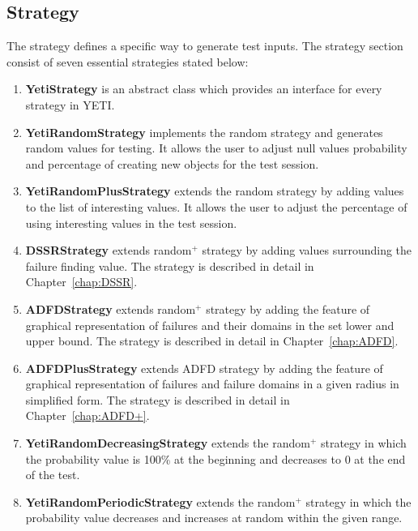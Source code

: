 \subsection{Strategy}
The strategy defines a specific way to generate test inputs. The strategy section consist of seven essential strategies stated below:
\begin{enumerate}
\item {\textbf{YetiStrategy}} is an abstract class which provides an interface for every strategy in YETI.
\item {\textbf{YetiRandomStrategy}} implements the random strategy and generates random values for testing. It allows the user to adjust null values probability and percentage of creating new objects for the test session. 
\item {\textbf{YetiRandomPlusStrategy}} extends the random strategy by adding values to the list of interesting values. It allows the user to adjust the percentage of using interesting values in the test session.
\item {\textbf{DSSRStrategy}} extends random$^+$ strategy by adding values surrounding the failure finding value. The strategy is described in detail in Chapter~\ref{chap:DSSR}.
\item {\textbf{ADFDStrategy}} extends random$^+$ strategy by adding the feature of graphical representation of failures and their domains in the set lower and upper bound. The strategy is described in detail in Chapter~\ref{chap:ADFD}.
\item {\textbf{ADFDPlusStrategy}} extends ADFD strategy by adding the feature of graphical representation of failures and failure domains in a given radius in simplified form. The strategy is described in detail in Chapter~\ref{chap:ADFD+}.
\item {\textbf{YetiRandomDecreasingStrategy}} extends the random$^+$ strategy in which the probability value is 100\% at the beginning and decreases to 0 at the end of the test.
\item {\textbf{YetiRandomPeriodicStrategy}} extends the random$^+$ strategy in which the probability value decreases and increases at random within the given range.
\end{enumerate}






